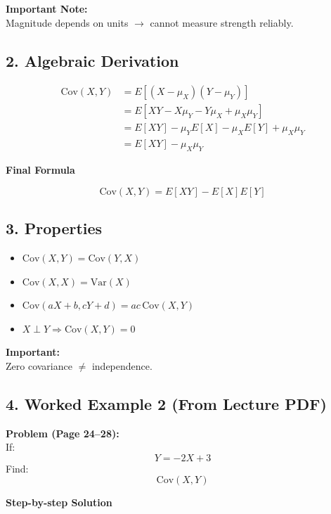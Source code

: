 \documentclass[11pt]{article}
\begin{document}
\noindent\textbf{Important Note:}\\
Magnitude depends on units $\rightarrow$ cannot measure strength reliably.

\subsection*{2. Algebraic Derivation}

\begin{align*}
\text{Cov}(X,Y) &= E[(X-\mu_X)(Y-\mu_Y)] \\
&= E[XY - X\mu_Y - Y\mu_X + \mu_X\mu_Y] \\
&= E[XY] - \mu_Y E[X] - \mu_X E[Y] + \mu_X\mu_Y \\
&= E[XY] - \mu_X\mu_Y
\end{align*}

\noindent\textbf{Final Formula}
\begin{tcolorbox}[colback=green!5!white,colframe=green!60!black,width=\linewidth,arc=1mm,auto outer arc]
\[
\text{Cov}(X,Y)=E[XY]-E[X]E[Y]
\]
\end{tcolorbox}

\subsection*{3. Properties}

\begin{itemize}
    \item $\text{Cov}(X,Y)=\text{Cov}(Y,X)$
    \item $\text{Cov}(X,X)=\text{Var}(X)$
    \item $\text{Cov}(aX+b,cY+d)=ac\,\text{Cov}(X,Y)$
    \item $X \perp Y \Rightarrow \text{Cov}(X,Y)=0$
\end{itemize}

\noindent\textbf{Important:}\\
Zero covariance $\neq$ independence.

\newpage

\subsection*{4. Worked Example 2 (From Lecture PDF)}

\noindent\textbf{Problem (Page 24–28):}\\
If:
\[
Y=-2X+3
\]
Find:
\[
\text{Cov}(X,Y)
\]

\noindent\textbf{Step-by-step Solution}
\end{document}
